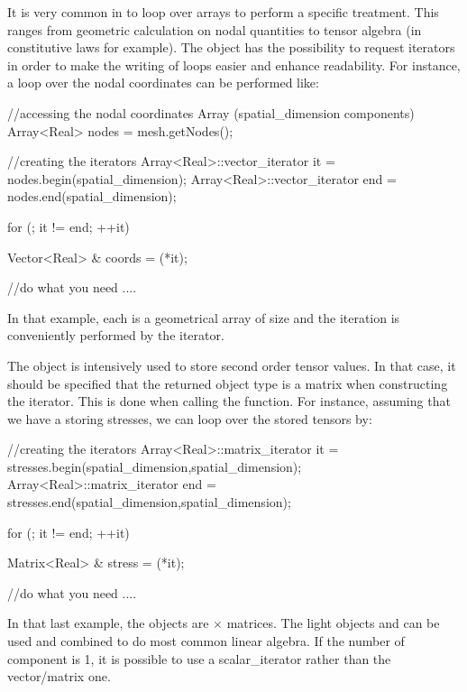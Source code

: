 It is very common in \akantu to loop over arrays to perform a specific
treatment. This ranges from geometric calculation on nodal quantities
to tensor algebra (in constitutive laws for example).
The  object has the possibility to request iterators
in order to make the writing of loops easier and enhance readability.
For instance, a loop over the nodal coordinates can be performed like:
\begin{cpp}
  //accessing the nodal coordinates Array (spatial_dimension components)
  Array<Real> nodes = mesh.getNodes();

  //creating the iterators
  Array<Real>::vector_iterator it  = nodes.begin(spatial_dimension);
  Array<Real>::vector_iterator end = nodes.end(spatial_dimension);

  for (; it != end; ++it){
    Vector<Real> & coords = (*it);

    //do what you need
    ....

  }
\end{cpp}
In that example, each  is a geometrical array of
size  and the iteration is conveniently
performed by the  iterator.

The  object is intensively used to store second order
tensor values.  In that case, it should be specified that the returned
object type is a matrix when constructing the iterator. This is done
when calling the  function. For instance, assuming that we
have a  storing stresses, we can loop over the stored
tensors by:

\begin{cpp}
  //creating the iterators
  Array<Real>::matrix_iterator it  = stresses.begin(spatial_dimension,spatial_dimension);
  Array<Real>::matrix_iterator end = stresses.end(spatial_dimension,spatial_dimension);

  for (; it != end; ++it){
    Matrix<Real> & stress = (*it);

    //do what you need
    ....

  }
\end{cpp}
In that last example, the  objects are
 $\times$  matrices.
The light objects  and  can be used and
combined to do most common linear algebra. If the number of component
is 1, it is possible to use a scalar\_iterator rather than the
vector/matrix one.


